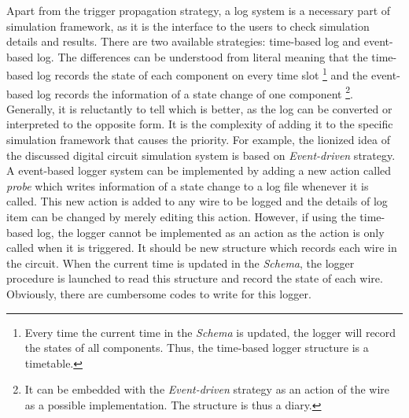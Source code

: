 \documentclass[12pt,a4paper]{report}
\begin{document}
        Apart from the trigger propagation strategy, a log system is a necessary part of simulation framework, as it is the interface to the users to check simulation details and results. There are two available strategies: time-based log and event-based log. The differences can be understood from literal meaning that the time-based log records the state of each component on every time slot \footnote{Every time the current time in the \emph{Schema} is updated, the logger will record the states of all components. Thus, the time-based logger structure is a timetable.} and the event-based log records the information of a state change of one component \footnote{It can be embedded with the \emph{Event-driven} strategy as an action of the wire as a possible implementation. The structure is thus a diary.}. Generally, it is reluctantly to tell which is better, as the log can be converted or interpreted to the opposite form. It is the complexity of adding it to the specific simulation framework that causes the priority. For example, the lionized idea of the discussed digital circuit simulation system is based on \emph{Event-driven} strategy. A event-based logger system can be implemented by adding a new action called \emph{probe} which writes information of a state change to a log file whenever it is called. This new action is added to any wire to be logged and the details of log item can be changed by merely editing this action. However, if using the time-based log, the logger cannot be implemented as an action as the action is only called when it is triggered. It should be new structure which records each wire in the circuit. When the current time is updated in the \emph{Schema}, the logger procedure is launched to read this structure and record the state of each wire. Obviously, there are cumbersome codes to write for this logger.
\end{document}
